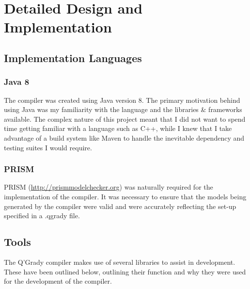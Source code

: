\documentclass[report.tex]{subfiles}
\begin{document}
\chapter{Detailed Design and Implementation} %
\label{cha:detailed_design_and_implementation}


\section{Implementation Languages} %
\label{sec:implementation_languages}

\subsection{Java 8} %
\label{sub:java_8}
The compiler was created using Java version 8. The primary motivation behind
using Java was my familiarity with the language and the libraries \& frameworks
available. The complex nature of this project meant that I did not want to spend
time getting familiar with a language such as C++, while I knew that I take
advantage of a build system like Maven to handle the inevitable dependency and
testing suites I would require.

\subsection{PRISM} %
\label{sub:prism}
PRISM (\url{http://prismmodelchecker.org}) was naturally required for the
implementation of the compiler. It was necessary to ensure that the models being
generated by the compiler were valid and were accurately reflecting the set-up
specified in a .qgrady file.


\section{Tools} %
\label{sec:tools}
The Q'Grady compiler makes use of several libraries to assist in development.
These have been outlined below, outlining their function and why they were used
for the development of the compiler.
\end{document}
